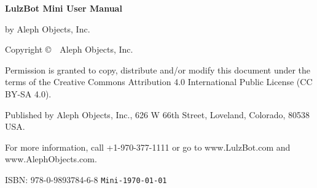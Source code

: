 %
%
%
%
%


\clearpage\null\vfill
\begingroup 
\thispagestyle{empty}
\footnotesize\raggedright
\setlength{\parskip}{0.5\baselineskip}

\textbf{LulzBot\textsuperscript{\miniscule{\texttrademark}} Mini User Manual}

by Aleph Objects, Inc.

Copyright \copyright\ \the\year\ Aleph Objects, Inc.\par
Permission is granted to copy, distribute and\slash or modify 
this document under the terms of the
Creative Commons Attribution 4.0 International Public License
(CC BY-SA 4.0).

Published by Aleph Objects, Inc., 626 W 66th Street, Loveland, Colorado, 80538 USA.

For more information, call +1-970-377-1111 or go to www.LulzBot.com and www.AlephObjects.com.

ISBN: 978-0-9893784-6-8
\renewcommand{\dateseparator}{}
\hfill\texttt{Mini-\yyyymmdddate\today} %
\endgroup
\pagebreak{}
